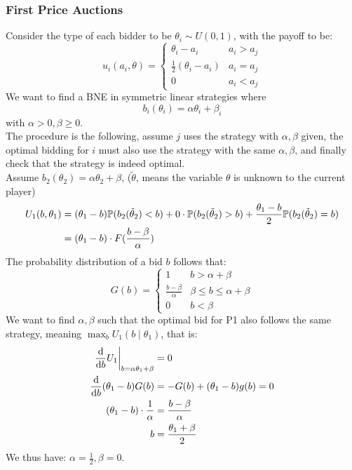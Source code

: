 \subsubsection{First Price Auctions}
Consider the type of each bidder to be $\theta_i \sim U(0, 1)$, with the payoff to be:
$$u_i(a_i, \theta) = \begin{cases}
    \theta_i - a_i & a_i > a_j \\
    \frac{1}{2}(\theta_i - a_i) & a_i = a_j \\
    0 & a_i < a_j
\end{cases}$$
We want to find a BNE in symmetric linear strategies where
$$b_i(\theta_i) = \alpha \theta_i + \beta_i$$
with $\alpha > 0, \beta \ge 0$. \\
The procedure is the following, assume $j$ uses the strategy with $\alpha, \beta$ given, the optimal bidding for $i$ must also use the strategy with the same $\alpha, \beta$, and finally check that the strategy is indeed optimal. \\
Assume $b_2(\theta_2) = \alpha \theta_2 + \beta$, ($\tilde{\theta}$, means the variable $\theta$ is unknown to the current player)
\begin{align*}
    U_1(b, \theta_1) &= (\theta_1 - b)\mathbb{P}(b_2(\tilde{\theta}_2) < b) + 0 \cdot \mathbb{P}(b_2(\tilde{\theta}_2) > b) + \frac{\theta_1 - b}{2}\mathbb{P}(b_2(\tilde{\theta}_2) = b) \\
    &= (\theta_1 - b) \cdot F(\frac{b - \beta}{\alpha})
\end{align*}
The probability distribution of a bid $b$ follows that:
$$G(b) = \begin{cases}
    1 & b > \alpha + \beta \\
    \frac{b - \beta}{\alpha} & \beta \le b \le \alpha + \beta \\
    0 & b < \beta
\end{cases}$$
We want to find $\alpha, \beta$ such that the optimal bid for P1 also follows the same strategy, meaning $\max_{b}U_1(b \mid \theta_1)$, that is:
\begin{align*}
    \eval{\dv{b}U_1}_{b = \alpha \theta_1 + \beta} &= 0 \\
    \dv{b}(\theta_1 - b)G(b) &= -G(b) + (\theta_1 - b)g(b) = 0 \\
    (\theta_1 - b) \cdot \frac{1}{\alpha} &= \frac{b - \beta}{\alpha} \\
    b &= \frac{\theta_1 + \beta}{2}
\end{align*}
We thus have: $\alpha = \frac{1}{2}, \beta = 0$. \\

